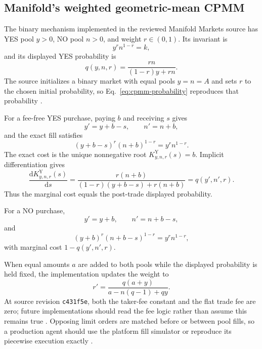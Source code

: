 \documentclass[journal,a4paper]{IEEEtran}
\begin{document}
\subsection{Manifold's weighted geometric-mean CPMM}
The binary mechanism implemented in the reviewed Manifold Markets source has YES pool $y>0$, NO pool $n>0$, and weight $r\in(0,1)$. Its invariant is
\begin{equation}
y^r n^{1-r}=k,
\label{eq:cpmm-invariant}
\end{equation}
and its displayed YES probability is
\begin{equation}
q(y,n,r)
=
\frac{rn}{(1-r)y+rn}.
\label{eq:cpmm-probability}
\end{equation}
The source initializes a binary market with equal pools $y=n=A$ and sets $r$ to the chosen initial probability, so Eq.~\eqref{eq:cpmm-probability} reproduces that probability \cite{manifold-cpmm,manifold-contract}.

For a fee-free YES purchase, paying $b$ and receiving $s$ gives
\begin{equation}
y'=y+b-s,
\qquad
n'=n+b,
\end{equation}
and the exact fill satisfies
\begin{equation}
(y+b-s)^r(n+b)^{1-r}=y^rn^{1-r}.
\label{eq:cpmm-yes-fill}
\end{equation}
The exact cost is the unique nonnegative root $K_{y,n,r}^{\mathrm{Y}}(s)=b$. Implicit differentiation gives
\begin{equation}
\frac{\mathrm{d}K_{y,n,r}^{\mathrm{Y}}(s)}{\mathrm{d}s}
=
\frac{r(n+b)}{(1-r)(y+b-s)+r(n+b)}
=
q(y',n',r).
\label{eq:cpmm-yes-marginal}
\end{equation}
Thus the marginal cost equals the post-trade displayed probability.

For a NO purchase,
\begin{equation}
y'=y+b,
\qquad
n'=n+b-s,
\end{equation}
and
\begin{equation}
(y+b)^r(n+b-s)^{1-r}=y^rn^{1-r},
\end{equation}
with marginal cost $1-q(y',n',r)$.

When equal amounts $a$ are added to both pools while the displayed probability is held fixed, the implementation updates the weight to
\begin{equation}
r'
=
\frac{q(a+y)}{a-n(q-1)+qy}.
\label{eq:liquidity-weight}
\end{equation}
At source revision \texttt{c431f5e}, both the taker-fee constant and the flat trade fee are zero; future implementations should read the fee logic rather than assume this remains true \cite{manifold-fees}. Opposing limit orders are matched before or between pool fills, so a production agent should use the platform fill simulator or reproduce its piecewise execution exactly \cite{manifold-cpmm}.
\end{document}
